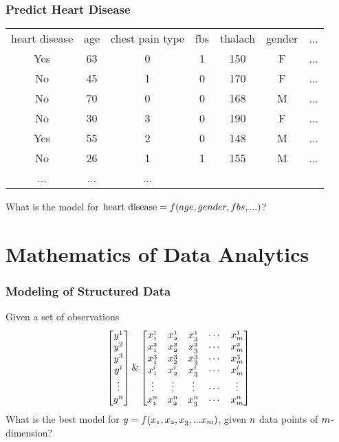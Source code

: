\documentclass[notheorems, aspectratio=54]{beamer}
\begin{document}
\begin{frame}
\frametitle{Predict Heart Disease}
\begin{table}[]
\begin{tabular} {c c c c c c c}
heart disease &age 	& chest pain type 	& fbs &thalach &gender &...\\ 
Yes		&63 	& 0 				&1 				&150		& F		&...\\
No 		&45 	& 1 				&0 				&170		&F		& ...\\
No 		&70 	& 0  				& 0  			&168		&M		& ...\\
No 		&30 	& 3 				&0 				&190		&F		& ...\\
Yes 	&55 	& 2 				& 0 			&148		&M		&...\\
No 		&26 	& 1 				& 1				&155	&M		&...\\
... & ... & ... & & & &
\end{tabular}
\end{table}
What is the model for $\text{heart disease}=\mathnormal{f}(age, gender, fbs,  ...)$?
\end{frame}

\section{Mathematics of Data Analytics}

\begin{frame}
\frametitle{Modeling of Structured Data}
Given a set of observations
\[ \begin{bmatrix}  \mathnormal{y}^1 \\ \mathnormal{y}^2\\\mathnormal{y}^3\\\mathnormal{y}^i \\ \vdots \\\mathnormal{y}^n \end{bmatrix}
\&
\begin{bmatrix}
   \mathnormal{x^1_1} &\mathnormal{x^1_2}  &\mathnormal{x^1_3} & \cdots &\mathnormal{x^1_m}\\
   \mathnormal{x^2_1} &\mathnormal{x^2_2} &\mathnormal{x^2_3} & \cdots &\mathnormal{x^2_m}\\
   \mathnormal{x^3_1} &\mathnormal{x^3_2} &\mathnormal{x^3_3} & \cdots &\mathnormal{x^3_m}\\
   \mathnormal{x^i_1} &\mathnormal{x^i_2} &\mathnormal{x^i_3} & \cdots &\mathnormal{x^i_m}\\
   \vdots &\vdots &\vdots & \cdots &\vdots\\
   \mathnormal{x^n_1} &\mathnormal{x^n_2} &\mathnormal{x^n_3} &\cdots &\mathnormal{x^n_m}
  \end{bmatrix}
\]
What is the best model for $\mathnormal{y}=\mathnormal{f(x_1, x_2, x_3,  ... x_m)}$, given $\mathnormal{n}$ data points of $\mathnormal{m}$-dimension?
\end{frame}
\end{document}
